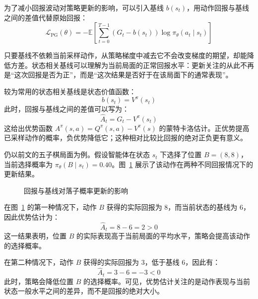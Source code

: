 为了减小回报波动对策略更新的影响，可以引入基线 $b(s_t)$，用动作回报与基线之间的差值代替原始回报：
\begin{equation}
\mathcal{L}_{\mathrm{PG}}(\theta)
=
-
\mathbb{E}
\left[
\sum_{t=0}^{T-1}
\left(
G_t-b(s_t)
\right)
\log\pi_{\theta}(a_t\mid s_t)
\right]
\end{equation}

只要基线不依赖当前采样动作，从策略梯度中减去它不会改变梯度的期望，却能降低方差。状态相关基线可以理解为当前局面的正常回报水平：更新关注的从此不再是“这次回报是否为正”，而是“这次结果是否好于在该局面下的通常表现”。

较为常用的状态相关基线是状态价值函数：
\begin{equation}
b(s_t)=V^{\pi}(s_t)
\end{equation}
此时，回报与基线之间的差值可以写为：
\begin{equation}
\widehat{A}_t
=
G_t-V^{\pi}(s_t)
\end{equation}
这给出优势函数 $A^\pi(s,a)=Q^\pi(s,a)-V^\pi(s)$ 的蒙特卡洛估计。正优势提高已采样动作的概率，负优势降低它；这种相对比较比回报的绝对正负更有意义。

仍以前文的五子棋局面为例。假设智能体在状态 $s_t$ 下选择了位置 $B=(8,8)$，当前选择概率为 $\pi_{\theta}(B\mid s_t)=0.40$。图~\ref{fig:policy_advantage_update} 展示了该动作在两种不同回报情况下的更新结果。

\begin{figure}[htbp]
  \centering
  \caption{回报与基线对落子概率更新的影响}
  \label{fig:policy_advantage_update}
\end{figure}

在图~\ref{fig:policy_advantage_update} 的第一种情况下，动作 $B$ 获得的实际回报为 $8$，而当前状态的基线为 $6$，因此优势估计为：
\begin{equation}
\widehat{A}_t
=
8-6
=
2>0
\end{equation}
这一结果表明，位置 $B$ 的实际表现高于当前局面的平均水平，策略会提高该动作的选择概率。

在第二种情况下，动作 $B$ 获得的实际回报为 $3$，低于基线 $6$，因此有：
\begin{equation}
\widehat{A}_t
=
3-6
=
-3<0
\end{equation}
此时，策略会降低位置 $B$ 的选择概率。可见，优势估计关注的是动作表现与当前状态一般水平之间的差异，而不是回报的绝对大小。

